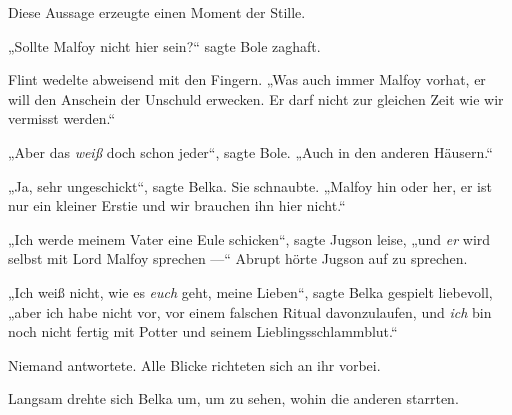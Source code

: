 Diese Aussage erzeugte einen Moment der Stille.

„Sollte Malfoy nicht hier sein?“ sagte Bole zaghaft.

Flint wedelte abweisend mit den Fingern.
„Was auch immer Malfoy vorhat, er will den Anschein der Unschuld erwecken. Er darf nicht zur gleichen Zeit wie wir vermisst werden.“

„Aber das \emph{weiß} doch schon jeder“, sagte Bole.
„Auch in den anderen Häusern.“

„Ja, sehr ungeschickt“, sagte Belka. Sie schnaubte.
„Malfoy hin oder her, er ist nur ein kleiner Erstie und wir brauchen ihn hier nicht.“

„Ich werde meinem Vater eine Eule schicken“, sagte Jugson leise, „und \emph{er} wird selbst mit Lord Malfoy sprechen —“ Abrupt hörte Jugson auf zu sprechen.

„Ich weiß nicht, wie es \emph{euch} geht, meine Lieben“, sagte Belka gespielt liebevoll, „aber ich habe nicht vor, vor einem falschen Ritual davonzulaufen, und \emph{ich} bin noch nicht fertig mit Potter und seinem Lieblingsschlammblut.“

Niemand antwortete. Alle Blicke richteten sich an ihr vorbei.

Langsam drehte sich Belka um, um zu sehen, wohin die anderen starrten.

